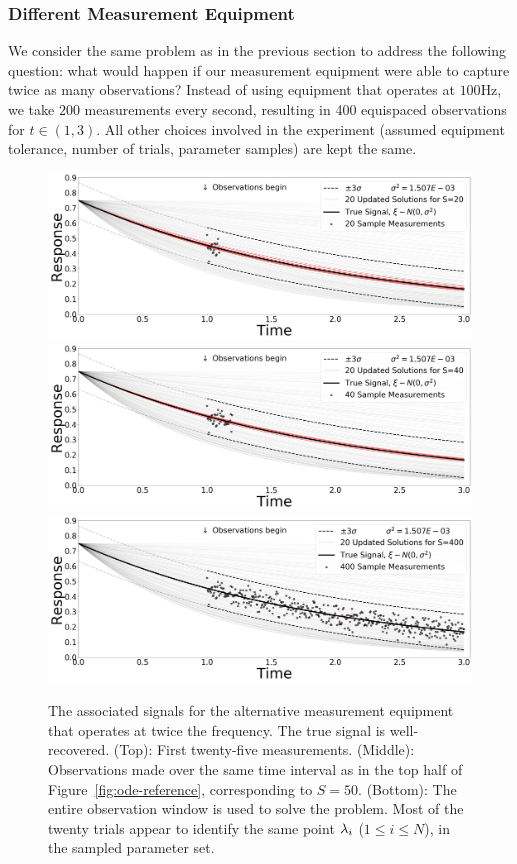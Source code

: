 \subsubsection{Different Measurement Equipment}

We consider the same problem as in the previous section to address the following question: what would happen if our measurement equipment were able to capture twice as many observations?
Instead of using equipment that operates at $100$Hz, we take $200$ measurements every second, resulting in 400 equispaced observations for $t \in (1,3)$.
All other choices involved in the experiment (assumed equipment tolerance, number of trials, parameter samples) are kept the same.

\begin{figure}[htbp]
  \includegraphics[width=\linewidth]{figures/ode/ode-alt_20_reference_solution}
  \includegraphics[width=\linewidth]{figures/ode/ode-alt_40_reference_solution}
  \includegraphics[width=\linewidth]{figures/ode/ode-alt_400_reference_solution}
  \caption{The associated signals for the alternative measurement equipment that operates at twice the frequency.
  The true signal is well-recovered.
  (Top): First twenty-five measurements.
  (Middle): Observations made over the same time interval as in the top half of Figure~\ref{fig:ode-reference}, corresponding to $S=50$.
  (Bottom): The entire observation window is used to solve the problem. Most of the twenty trials appear to identify the same point $\lambda_i$ ($1\leq i \leq N$), in the sampled parameter set.
  }
  \label{fig:ode-alt-reference}
\end{figure}
